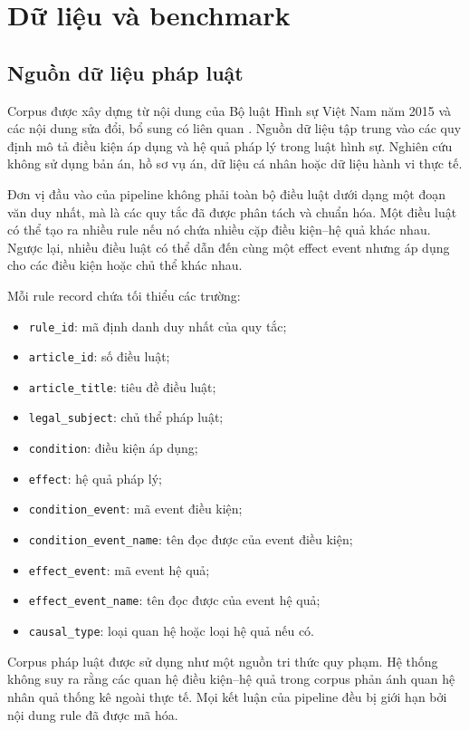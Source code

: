 \section{Dữ liệu và benchmark}
\label{sec:data}

\subsection{Nguồn dữ liệu pháp luật}

Corpus được xây dựng từ nội dung của Bộ luật Hình sự Việt Nam năm 2015 và
các nội dung sửa đổi, bổ sung có liên quan
\cite{quochoi2015blhs,quochoi2017suadoiblhs}. Nguồn dữ liệu tập trung vào
các quy định mô tả điều kiện áp dụng và hệ quả pháp lý trong luật hình sự.
Nghiên cứu không sử dụng bản án, hồ sơ vụ án, dữ liệu cá nhân hoặc dữ liệu
hành vi thực tế.

Đơn vị đầu vào của pipeline không phải toàn bộ điều luật dưới dạng một đoạn
văn duy nhất, mà là các quy tắc đã được phân tách và chuẩn hóa. Một điều luật
có thể tạo ra nhiều rule nếu nó chứa nhiều cặp điều kiện--hệ quả khác nhau.
Ngược lại, nhiều điều luật có thể dẫn đến cùng một effect event nhưng áp
dụng cho các điều kiện hoặc chủ thể khác nhau.

Mỗi rule record chứa tối thiểu các trường:

\begin{itemize}
    \item \texttt{rule\_id}: mã định danh duy nhất của quy tắc;
    \item \texttt{article\_id}: số điều luật;
    \item \texttt{article\_title}: tiêu đề điều luật;
    \item \texttt{legal\_subject}: chủ thể pháp luật;
    \item \texttt{condition}: điều kiện áp dụng;
    \item \texttt{effect}: hệ quả pháp lý;
    \item \texttt{condition\_event}: mã event điều kiện;
    \item \texttt{condition\_event\_name}: tên đọc được của event điều kiện;
    \item \texttt{effect\_event}: mã event hệ quả;
    \item \texttt{effect\_event\_name}: tên đọc được của event hệ quả;
    \item \texttt{causal\_type}: loại quan hệ hoặc loại hệ quả nếu có.
\end{itemize}

Corpus pháp luật được sử dụng như một nguồn tri thức quy phạm. Hệ thống
không suy ra rằng các quan hệ điều kiện--hệ quả trong corpus phản ánh quan
hệ nhân quả thống kê ngoài thực tế. Mọi kết luận của pipeline đều bị giới
hạn bởi nội dung rule đã được mã hóa.

